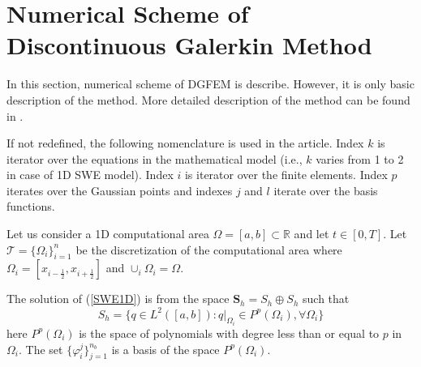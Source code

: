 \section{Numerical Scheme of Discontinuous Galerkin Method}\label{NS}
In this section, numerical scheme of DGFEM is describe. However, it is only basic description of the method. More detailed description of the method can be found in \cite{reed1973}.

If not redefined, the following nomenclature is used in the article. Index $k$ is iterator over the equations in the mathematical model (i.e., $k$ varies from 1 to 2 in case of 1D SWE model). Index $i$ is iterator over the finite elements. Index $p$ iterates over the Gaussian points and indexes $j$ and $l$ iterate over the basis functions.

Let us consider a 1D computational area $\Omega=[a,b] \subset \mathbb{R}$ and let $t\in[0,T]$. Let $\mathcal{T}=\lbrace \Omega_i \rbrace_{i=1}^n$ be the discretization of the computational area where $\Omega_i=[x_{i-\frac12},x_{i+\frac12}]$ and $\cup_{i}\Omega_i=\Omega$.

The solution of (\ref{SWE1D}) is from the space $\mathbf{S}_h=S_h\oplus S_h$ such that
\begin{equation}
S_h=\lbrace q \in L^2([a,b]):q|_{\Omega_i}\in P^p(\Omega_i),\forall \Omega_i\rbrace
\end{equation}
  here $P^p(\Omega_i)$ is the space of polynomials with degree less than or equal to $p$ in $\Omega_i$. The set $\lbrace \varphi_i^j \rbrace_{j=1}^{n_b}$ is a basis of the space $P^p(\Omega_i)$.


